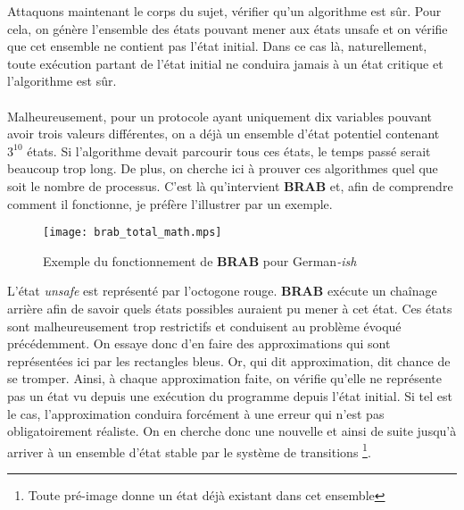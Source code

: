 \documentclass{memoir}
\begin{document}
		Attaquons maintenant le corps du sujet, vérifier qu'un algorithme est sûr. Pour cela, on génère l'ensemble des états pouvant mener aux états unsafe et on vérifie que cet ensemble ne contient pas l'état initial. Dans ce cas là, naturellement, toute exécution partant de l'état initial ne conduira jamais à un état critique et l'algorithme est sûr. 
		
		\paragraph{} Malheureusement, pour un protocole ayant uniquement dix variables pouvant avoir trois valeurs différentes, on a déjà un ensemble d'état potentiel contenant $3^{10}$ états. Si l'algorithme devait parcourir tous ces états, le temps passé serait beaucoup trop long. De plus, on cherche ici à prouver ces algorithmes quel que soit le nombre de processus. C'est là qu'intervient \textbf{BRAB} et, afin de comprendre comment il fonctionne, je préfère l'illustrer par un exemple.
		
		\begin{figure}[H]
  			\centering 
  			\texttt{[image: brab\_total\_math.mps]}
  			\caption{Exemple du fonctionnement de \textbf{BRAB} pour German\textit{-ish}}
  			\label{fig:brab_total}
		\end{figure}

		L'état \textit{unsafe} est représenté par l'octogone rouge. \textbf{BRAB} exécute un chaînage arrière afin de savoir quels états possibles auraient pu mener à cet état. Ces états sont malheureusement trop restrictifs et conduisent au problème évoqué précédemment. On essaye donc d'en faire des approximations qui sont représentées ici par les rectangles bleus. Or, qui dit approximation, dit chance de se tromper. Ainsi, à chaque approximation faite, on vérifie qu'elle ne représente pas un état vu depuis une exécution du programme depuis l'état initial. Si tel est le cas, l'approximation conduira forcément à une erreur qui n'est pas obligatoirement réaliste. On en cherche donc une nouvelle et ainsi de suite jusqu'à arriver à un ensemble d'état stable par le système de transitions \footnote{Toute pré-image donne un état déjà existant dans cet ensemble}.
		
\end{document}
